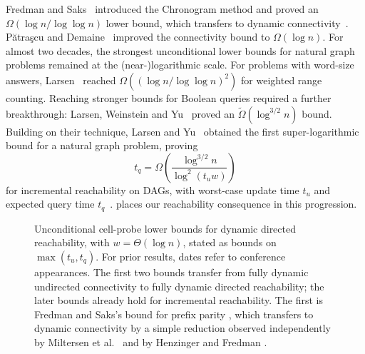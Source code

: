 \documentclass[11pt]{article}
\theoremstyle{plain}
\theoremstyle{definition}
\theoremstyle{remark}
\newcommand{\Patrascu}{P\u{a}tra\c{s}cu\xspace}
\begin{document}
Fredman and Saks~\cite{fredman_cell_1989} introduced the Chronogram method and proved an $\Omega(\log n/\log\log n)$ lower bound, which transfers to dynamic connectivity~\cite{miltersen_complexity_1994,henzinger_lower_1998}. \Patrascu and Demaine~\cite{patrascu_logarithmic_2006} improved the connectivity bound to $\Omega(\log n)$. For almost two decades, the strongest unconditional lower bounds for natural graph problems remained at the (near-)logarithmic scale. For problems with word-size answers, Larsen~\cite{larsen_cell_2012} reached $\Omega((\log n/\log\log n)^2)$ for weighted range counting. Reaching stronger bounds for Boolean queries required a further breakthrough: Larsen, Weinstein and Yu~\cite{larsen_crossing_2020} proved an $\widetilde\Omega(\log^{3/2}n)$ bound. Building on their technique, Larsen and Yu~\cite{larsen_super-logarithmic_2025} obtained the first super-logarithmic bound for a natural graph problem, proving
\[
t_q=\Omega\!\left(\frac{\log^{3/2}n}{\log^2(t_u w)}\right)
\]
for incremental reachability on DAGs, with worst-case update time $t_u$ and expected query time $t_q$~\cite[Theorem~1]{larsen_super-logarithmic_2025}.  places our reachability consequence in this progression.

\begin{figure}[!ht]
\centering
{}
\caption{Unconditional cell-probe lower bounds for dynamic directed reachability, with $w = \Theta(\log n)$, stated as bounds on $\max(t_u, t_q)$. For prior results, dates refer to conference appearances. The first two bounds transfer from fully dynamic undirected connectivity to fully dynamic directed reachability; the later bounds already hold for incremental reachability. The first is Fredman and Saks's bound for prefix parity \cite{fredman_cell_1989}, which transfers to dynamic connectivity by a simple reduction observed independently by Miltersen et al.\ \cite{miltersen_complexity_1994} and by Henzinger and Fredman \cite{henzinger_lower_1998}.}
\label{fig:reach-timeline}
\end{figure}
\end{document}
